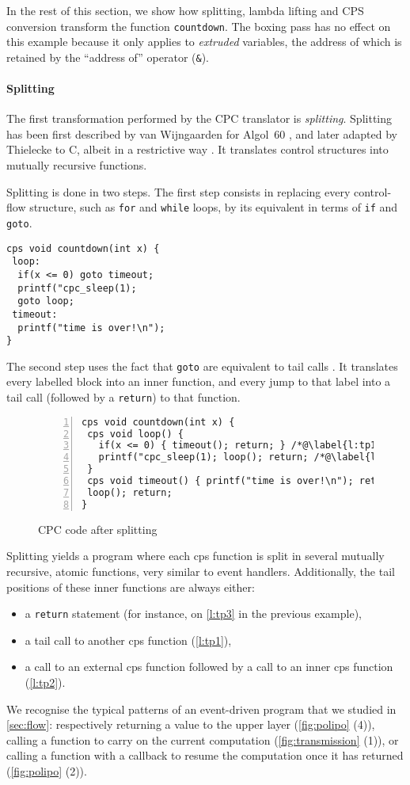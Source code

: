 \documentclass[a4paper]{llncs}
\begin{document}
In the rest of this section, we show how splitting, lambda lifting and CPS
conversion transform the function \texttt{countdown}.  The boxing pass has no
effect on this example because it only applies to \emph{extruded} variables, the
address of which is retained by the ``address of'' operator (\verb+&+).

\paragraph{Splitting}

The first transformation performed by the CPC translator is \emph{splitting}.
Splitting has been first described by van Wijngaarden for Algol~60
\cite{wijngaarden}, and later adapted by Thielecke to C, albeit in a restrictive
way \cite{DBLP:journals/sigact/Thielecke99}.  It translates control structures 
into mutually recursive functions.

Splitting is done in two steps.  The first step consists in replacing every
control-flow structure, such as \texttt{for} and \texttt{while} loops, by its
equivalent in terms of \texttt{if} and \texttt{goto}.
\begin{lstlisting}
cps void countdown(int x) {
 loop:
  if(x <= 0) goto timeout;
  printf("cpc_sleep(1);
  goto loop;
 timeout:
  printf("time is over!\n");
}
\end{lstlisting}
The second step uses the fact that \texttt{goto} are equivalent to tail calls
\cite{Ste76}.  It translates every labelled block into an inner function, and
every jump to that label into a tail call (followed by a \texttt{return}) to
that function.
\begin{figure}[htbp]
\begin{lstlisting}[numbers=left]
cps void countdown(int x) {
 cps void loop() {
   if(x <= 0) { timeout(); return; } /*@\label{l:tp1}@*/
   printf("cpc_sleep(1); loop(); return; /*@\label{l:tp2}@*/
 }
 cps void timeout() { printf("time is over!\n"); return; } /*@\label{l:tp3}@*/
 loop(); return;
}
\end{lstlisting}
\caption{CPC code after splitting}
\label{lst:split}
\end{figure}

Splitting yields a program where each cps function is split in several mutually
recursive, atomic functions, very similar to event handlers.  Additionally, the
tail positions of these inner functions are always either:
\begin{itemize}
    \item a \texttt{return} statement (for instance, on \cref{l:tp3} in the
        previous example),
    \item a tail call to another cps function (\cref{l:tp1}),
  \item a call to an external cps function followed by a call to an
      inner cps function (\cref{l:tp2}).
\end{itemize}
We recognise the typical patterns of an event-driven program that we studied in
\cref{sec:flow}: respectively returning a value to the upper layer
(\cref{fig:polipo} (4)), calling a function to carry on the current computation
(\cref{fig:transmission} (1)), or calling a function with a callback to resume
the computation once it has returned (\cref{fig:polipo} (2)).
\end{document}
